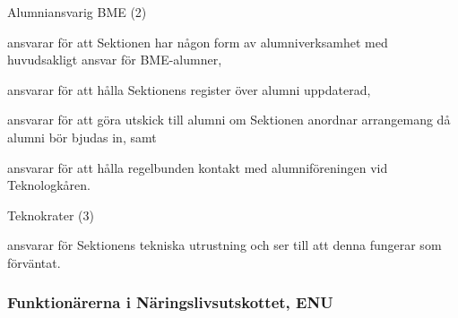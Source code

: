 \documentclass[10pt]{article}
\begin{document}
\begin{emptylist}
    \item Alumniansvarig BME (2)
        \begin{dashlist}
            \item ansvarar för att Sektionen har någon form av alumniverksamhet med huvudsakligt ansvar för BME-alumner,
            \item ansvarar för att hålla Sektionens register över alumni uppdaterad,
            \item ansvarar för att göra utskick till alumni om Sektionen anordnar arrangemang då alumni
bör bjudas in, samt
            \item  ansvarar för att hålla regelbunden kontakt med alumniföreningen vid Teknologkåren.
        \end{dashlist}
    \item Teknokrater (3)
        \begin{dashlist}
            \item ansvarar för Sektionens tekniska utrustning och ser till att denna fungerar som förväntat.
        \end{dashlist}
\end{emptylist}

\subsubsection{Funktionärerna i Näringslivsutskottet, ENU}
\end{document}
